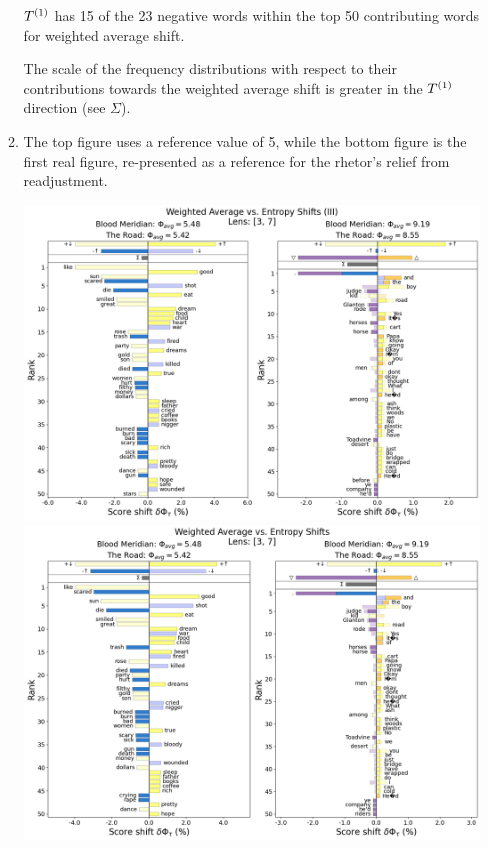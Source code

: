 \begin{enumerate}
\begin{enumerate}[wide, labelwidth=!, labelindent=0pt]
    $T^{(1)}$ has 15 of the 23 negative words within the top 50 contributing words for weighted average shift.

    The scale of the frequency distributions with respect to their contributions towards the weighted average shift is greater in the $T^{(1)}$ direction (see $\Sigma$).
    \clearpage
    
  \item
    The top figure uses a reference value of 5, while the bottom figure is the first real figure, re-presented as a reference for the rhetor's relief from readjustment.
    
    \begin{center}
        \includegraphics[width=\linewidth]{figures/21_1_e.png}
        \includegraphics[width=\linewidth]{figures/21_1_a2.png}
    \end{center}
    

\end{enumerate}
\end{enumerate}
